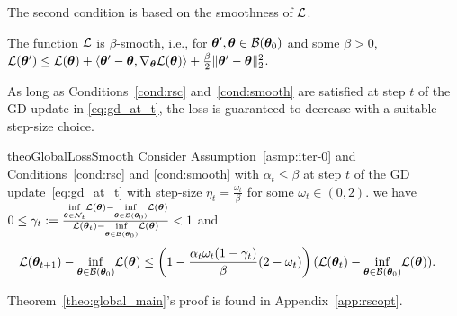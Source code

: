The second condition is based on the smoothness of ${\mathcal{L}}$. 
\begin{cond}[{\bf Smoothness}]
The function ${\mathcal{L}}$ is $\beta$-smooth, i.e., for ${\bm{\theta}}',{\bm{\theta}} \in {\cal B}({\bm{\theta}}_0)$
and some $\beta>0$, 
${\mathcal{L}}({\bm{\theta}}') \leq {\mathcal{L}}({\bm{\theta}}) + \langle {\bm{\theta}}'-{\bm{\theta}}, \nabla_{{\bm{\theta}}} {\mathcal{L}}({\bm{\theta}}) \rangle + \frac{\beta}{2} \| {\bm{\theta}}'-{\bm{\theta}} \|^2_2$.
\label{cond:smooth}
\end{cond}
As long as Conditions~\ref{cond:rsc} and~\ref{cond:smooth} are satisfied at step $t$ of the GD update in \eqref{eq:gd_at_t}, the loss is guaranteed to decrease with a suitable step-size choice. 
%
%
\begin{restatable}{theo}{GlobalLossSmooth}
Consider Assumption~\ref{asmp:iter-0} and Conditions~\ref{cond:rsc} and \ref{cond:smooth} with $\alpha_t \leq \beta$ at step $t$ of the GD update~\eqref{eq:gd_at_t} with step-size $\eta_t=\frac{\omega_t}{\beta}$ for some $\omega_t \in(0,2)$. 
%
we have $0 \leq \gamma_t := \frac{\underset{{\bm{\theta}} \in \mathcal{N}_t}{\inf} {\mathcal{L}}({\bm{\theta}}) - \underset{{\bm{\theta}} \in {\cal B}({\bm{\theta}}_0)}{\inf} {\mathcal{L}}({\bm{\theta}})}{{\mathcal{L}}({\bm{\theta}}_t) - \underset{{\bm{\theta}} \in {\cal B}({\bm{\theta}}_0)}{\inf} {\mathcal{L}}({\bm{\theta}})} < 1$ 
%
and 
\begin{equation}
\begin{aligned}
    &{\mathcal{L}}({\bm{\theta}}_{t+1}) - \underset{{\bm{\theta}} \in {\cal B}({\bm{\theta}}_0)}{\inf} {\mathcal{L}}({\bm{\theta}})\leq \left(1-\frac{\alpha_t \omega_t (1-\gamma_t)}{\beta}(2-\omega_t) \right) ({\mathcal{L}}({\bm{\theta}}_t) - \underset{{\bm{\theta}} \in {\cal B}({\bm{\theta}}_0)}{\inf} {\mathcal{L}}({\bm{\theta}})).
\end{aligned}
\label{eq:conv-0}
\end{equation}
%
\label{theo:global_main}
\end{restatable}
Theorem~\ref{theo:global_main}'s proof is found in Appendix~\ref{app:rscopt}.

